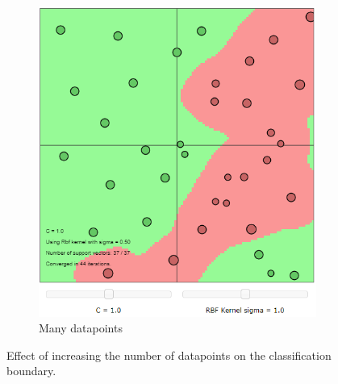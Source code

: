 \documentclass{article}
\begin{document}
\begin{figure}[h]
\begin{subfigure}[b]{0.3\textwidth}
                 \includegraphics[width=\textwidth]{Assignment 1/figures/RBF_many_datapoints.png}
                \caption{Many datapoints}
                 \label{fig:many_datapoints}
             \end{subfigure}
             \hspace{0.15\textwidth}
            \caption{Effect of increasing the number of datapoints on the classification boundary.}
        \end{figure}
        
\end{document}

